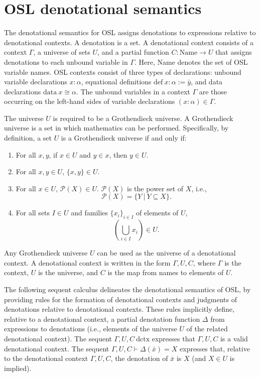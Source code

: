 \documentclass[11pt]{article}
\begin{document}
\section{OSL denotational semantics}

The denotational semantics for OSL assigns denotations to expressions
relative to denotational contexts. A denotation is a set.
A denotational context consists of a context $\Gamma$, a universe of
sets $U$, and a partial function $C : \text{Name} \to U$ that
assigns denotations to each unbound variable in $\Gamma$.
Here, Name denotes the set of OSL variable names.
OSL contexts consist of three types of declarations:
unbound variable declarations $x : \alpha$, equational definitions
$\text{def}\ x : \alpha := \bar{y}$, and data declarations
$\text{data}\ x \cong \alpha$. The unbound variables in a context
$\Gamma$ are those occurring on the left-hand sides of variable
declarations $(x : \alpha) \in \Gamma$.

The universe $U$ is required to be a Grothendieck universe.
A Grothendieck universe is a set in which
mathematics can be performed. Specifically, by definition, a set $U$ is a Grothendieck
universe if and only if:
\begin{enumerate}
	\item For all $x, y$, if $x \in U$ and $y \in x$, then $y \in U$.
	\item For all $x, y \in U$, $\{x,y\} \in U$.
	\item For all $x \in U$, $\mathcal{P}(X) \in U$. $\mathcal{P}(X)$ is the power set of $X$, i.e.,
		\begin{equation}
			\mathcal{P}(X) = \{Y\ |\ Y \subseteq X\}.
		\end{equation}
	\item For all sets $I \in U$ and families $\{x_i\}_{i \in I}$ of
		elements of $U$,
		\begin{equation}
			\left(\bigcup_{i \in I} x_i \right) \in U.
		\end{equation}
\end{enumerate}
Any Grothendieck universe $U$ can be used as the universe of
a denotational context. A denotational context is written
in the form $\Gamma,U,C$, where $\Gamma$ is the context,
$U$ is the universe, and $C$ is the map from names to
elements of $U$.

The following sequent calculus delineates the denotational semantics
of OSL, by providing rules for the formation of denotational
contexts and judgments of denotations relative to denotational
contexts. These rules implicitly define, relative to a
denotational context, a partial denotation
function $\Delta$ from expressions to denotations (i.e.,
elements of the universe $U$ of the related denotational
context). The sequent $\Gamma,U,C\ \text{dctx}$ expresses
that $\Gamma,U,C$ is a valid denotational context.
The sequent $\Gamma,U,C \vdash \Delta(\bar{x}) = X$
expresses that, relative to the denotational context
$\Gamma,U,C$, the denotation of $\bar{x}$ is $X$
(and $X \in U$ is implied).
\end{document}
